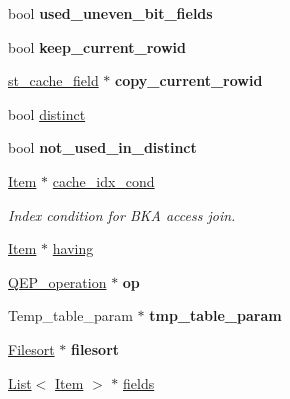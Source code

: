\begin{DoxyCompactItemize}
bool {\bfseries used\+\_\+uneven\+\_\+bit\+\_\+fields}
\item 
\mbox{\label{classQEP__TAB_af62455604db0672d44ba54517a6e1108}} 
bool {\bfseries keep\+\_\+current\+\_\+rowid}
\item 
\mbox{\label{classQEP__TAB_a557397a29a1e53378e5dc2de2ad1617a}} 
\mbox{\hyperlink{structst__cache__field}{st\+\_\+cache\+\_\+field}} $\ast$ {\bfseries copy\+\_\+current\+\_\+rowid}
\item 
bool \mbox{\hyperlink{classQEP__TAB_a856c37d7d3dc2bb077ea27af9bb77b94}{distinct}}
\item 
\mbox{\label{classQEP__TAB_a8fc778d24ea7d5856a3c68927f6a6021}} 
bool {\bfseries not\+\_\+used\+\_\+in\+\_\+distinct}
\item 
\mbox{\label{classQEP__TAB_ad36d915468c71a7f66875ab83d6a1ed8}} 
\mbox{\hyperlink{classItem}{Item}} $\ast$ \mbox{\hyperlink{classQEP__TAB_ad36d915468c71a7f66875ab83d6a1ed8}{cache\+\_\+idx\+\_\+cond}}
\begin{DoxyCompactList}\small\item\em Index condition for B\+KA access join. \end{DoxyCompactList}\item 
\mbox{\hyperlink{classItem}{Item}} $\ast$ \mbox{\hyperlink{classQEP__TAB_aaca14beabf566906a4dd0b2c36b3c40e}{having}}
\item 
\mbox{\label{classQEP__TAB_ae7f7ad2f2f00e2f13ecb550afd91f99e}} 
\mbox{\hyperlink{classQEP__operation}{Q\+E\+P\+\_\+operation}} $\ast$ {\bfseries op}
\item 
\mbox{\label{classQEP__TAB_ab24715b0b3ac73b7ba6bdae7735c89d2}} 
Temp\+\_\+table\+\_\+param $\ast$ {\bfseries tmp\+\_\+table\+\_\+param}
\item 
\mbox{\label{classQEP__TAB_a5772c578663baf1e5848bc97ad5de37a}} 
\mbox{\hyperlink{classFilesort}{Filesort}} $\ast$ {\bfseries filesort}
\item 
\mbox{\hyperlink{classList}{List}}$<$ \mbox{\hyperlink{classItem}{Item}} $>$ $\ast$ \mbox{\hyperlink{classQEP__TAB_ac8d037d951812d2fb5a0705e467eafe3}{fields}}
\item 

\end{DoxyCompactItemize}
